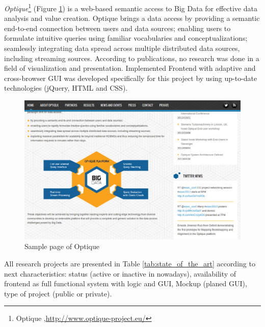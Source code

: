     \emph{Optique}\footnote{Optique ,\url{http://www.optique-project.eu/}} (Figure \ref{img:optique}) is a web-based  semantic access to Big Data for effective data analysis and value creation. Optique brings a data access by providing a semantic end-to-end connection between users and data sources; enabling users to formulate intuitive queries using familiar vocabularies and conceptualizations; seamlessly integrating data spread across multiple distributed data sources, including streaming sources\cite{calvanese-etal-JAIR-2013-explanation,ernestojimenezruizbernardocuencagrau2013ontology,DBLP:conf/dlog/MollerNOW13ohneCross}. According to publications, no research was done in a field of visualization and presentation. Implemented Frontend with adaptive and cross-browser GUI was developed specifically for this project by using up-to-date technologies (jQuery, HTML and CSS).
    \begin{figure}[!ht]
		\centering
		\includegraphics[scale=0.6]{Material/examples/Optique.png}   
		\caption[Sample page of Optique]{Sample page of Optique}  
		\label{img:optique}                
		\end{figure} 

    All research projects are presented in Table \ref{tab:state_of_the_art} according to next characteristics: status (active or inactive in nowadays), availability of frontend as full functional system with logic and GUI, Mockup (planed GUI), type of project (public or private).

